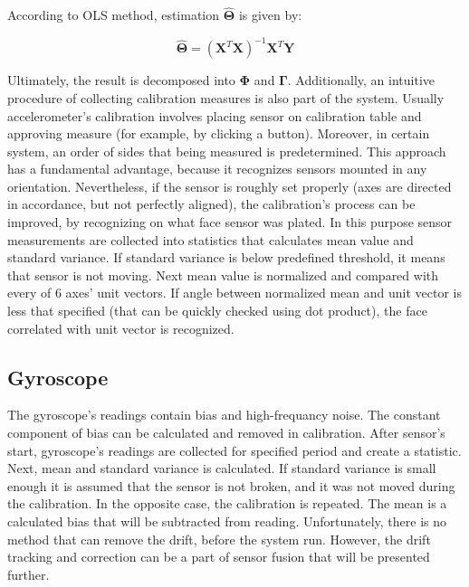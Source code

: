 According to OLS method, estimation $\bm{\hat{\Theta}}$ is given by:

\begin{equation}
	\bm{\hat{\Theta}} = \left( \bm{X}^T \bm{X} \right)^{-1} \bm{X}^T \bm{Y}
	\label{ols_est}
\end{equation}

Ultimately, the result is decomposed into $\bm{\Phi}$ and $\bm{\Gamma}$. Additionally, an intuitive procedure of collecting calibration measures is also part of the system. Usually accelerometer's calibration involves placing sensor on calibration table and approving measure (for example, by clicking a button). Moreover, in certain system, an order of sides that being measured is predetermined. This approach has a fundamental advantage, because it recognizes sensors mounted in any orientation. Nevertheless, if the sensor is roughly set properly (axes are directed in accordance, but not perfectly aligned), the calibration's process can be improved, by recognizing on what face sensor was plated. In this purpose sensor measurements are collected into statistics that calculates mean value and standard variance. If standard variance is below predefined threshold, it means that sensor is not moving. Next mean value is normalized and compared with every of 6 axes' unit vectors. If angle between normalized mean and unit vector is less that specified (that can be quickly checked using dot product), the face correlated with unit vector is recognized.



\subsection{Gyroscope}

The gyroscope's readings contain bias and high-frequancy noise. The constant component of bias can be calculated and removed in calibration. After sensor's start, gyroscope's readings are collected for specified period and create a statistic. Next, mean and standard variance is calculated. If standard variance is small enough it is assumed that the sensor is not broken, and it was not moved during the calibration. In the opposite case, the calibration is repeated. The mean is a calculated bias that will be subtracted from reading.
Unfortunately, there is no method that can remove the drift, before the system run. However, the drift tracking and correction can be a part of sensor fusion that will be presented further.\\

